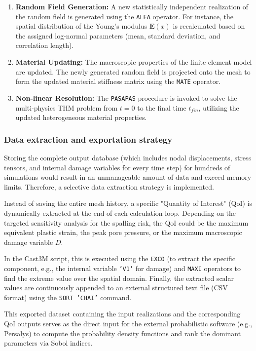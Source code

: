 \documentclass[a4paper,12pt,twoside]{report}     %
\begin{document}
\begin{enumerate}
    \item \textbf{Random Field Generation:} A new statistically independent realization of the random field is generated using the \texttt{ALEA} operator. For instance, the spatial distribution of the Young's modulus $\mathbf{E}(x)$ is recalculated based on the assigned log-normal parameters (mean, standard deviation, and correlation length).
    \item \textbf{Material Updating:} The macroscopic properties of the finite element model are updated. The newly generated random field is projected onto the mesh to form the updated material stiffness matrix using the \texttt{MATE} operator.
    \item \textbf{Non-linear Resolution:} The \texttt{PASAPAS} procedure is invoked to solve the multi-physics THM problem from $t=0$ to the final time $t_{fin}$, utilizing the updated heterogeneous material properties.
\end{enumerate}

\subsubsection{Data extraction and exportation strategy}
Storing the complete output database (which includes nodal displacements, stress tensors, and internal damage variables for every time step) for hundreds of simulations would result in an unmanageable amount of data and exceed memory limits. Therefore, a selective data extraction strategy is implemented.

Instead of saving the entire mesh history, a specific "Quantity of Interest" (QoI) is dynamically extracted at the end of each calculation loop. Depending on the targeted sensitivity analysis for the spalling risk, the QoI could be the maximum equivalent plastic strain, the peak pore pressure, or the maximum macroscopic damage variable $D$. 

In the Cast3M script, this is executed using the \texttt{EXCO} (to extract the specific component, e.g., the internal variable \texttt{'V1'} for damage) and \texttt{MAXI} operators to find the extreme value over the spatial domain. Finally, the extracted scalar values are continuously appended to an external structured text file (CSV format) using the \texttt{SORT 'CHAI'} command. 

This exported dataset containing the input realizations and the corresponding QoI outputs serves as the direct input for the external probabilistic software (e.g., Persalys) to compute the probability density functions and rank the dominant parameters via Sobol indices.
\end{document}
